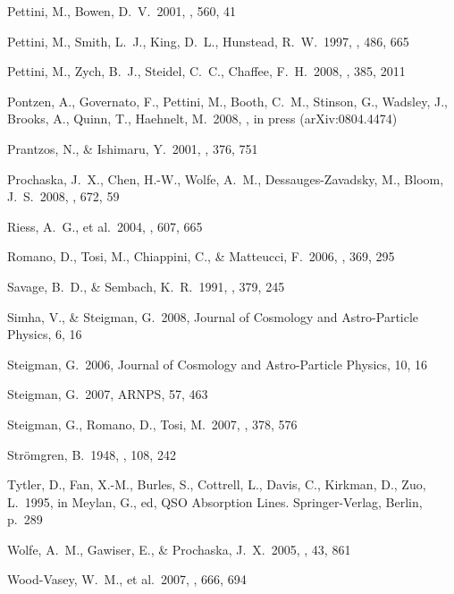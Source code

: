 \documentclass[useAMS,usenatbib]{mn2e}
\begin{document}
\begin{thebibliography}{}
\bibitem[]{}Pettini, M., Bowen, D.~V.\ 2001, \apj, 560, 41

 Pettini, M., Smith,
L.~J., King, D.~L.,  Hunstead, R.~W.\ 1997, \apj, 486, 665

 Pettini, M., Zych,
B.~J., Steidel, C.~C., Chaffee, F.~H.\ 2008, \mnras, 385, 2011

\bibitem[]{} Pontzen, A., Governato, F., Pettini, M., Booth, C.~M.,
Stinson, G., Wadsley, J., Brooks, A., Quinn, T., Haehnelt, M.\ 2008,
\mnras, in press (arXiv:0804.4474)

Prantzos, N., \& Ishimaru, Y.\ 2001, \aap, 376, 751

\bibitem[]{} Prochaska, J.~X., Chen, H.-W., Wolfe, A.~M.,
Dessauges-Zavadsky, M., Bloom, J.~S.\ 2008, \apj, 672, 59

 Riess, A.~G., et al.\
2004, \apj, 607, 665

 Romano, D., Tosi, M.,
Chiappini, C., \& Matteucci, F.\ 2006, \mnras, 369, 295

\bibitem[]{} Savage, B.~D., \& Sembach, K.~R.\ 1991, \apj, 379, 245

Simha, V., \& Steigman, G.\ 2008, Journal of Cosmology and 
Astro-Particle Physics, 6, 16 

 Steigman, G.\ 2006, Journal 
of Cosmology and Astro-Particle Physics, 10, 16 

\bibitem[]{} Steigman, G.\ 2007, ARNPS, 57, 463

 Steigman, G., Romano,
D., Tosi, M.\ 2007, \mnras, 378, 576

 Str{\"o}mgren, B.\ 1948,
\apj, 108, 242

\bibitem[]{} Tytler, D., Fan, X.-M., Burles, S., Cottrell, L., Davis, C.,
Kirkman, D., Zuo, L.\ 1995, in Meylan, G., ed,
QSO Absorption Lines. Springer-Verlag, Berlin, p.~289

 Wolfe, A.~M., Gawiser,
E., \& Prochaska, J.~X.\ 2005, \araa, 43, 861

 Wood-Vasey, W.~M.,
et al.\ 2007, \apj, 666, 694

\end{thebibliography}
\end{document}
